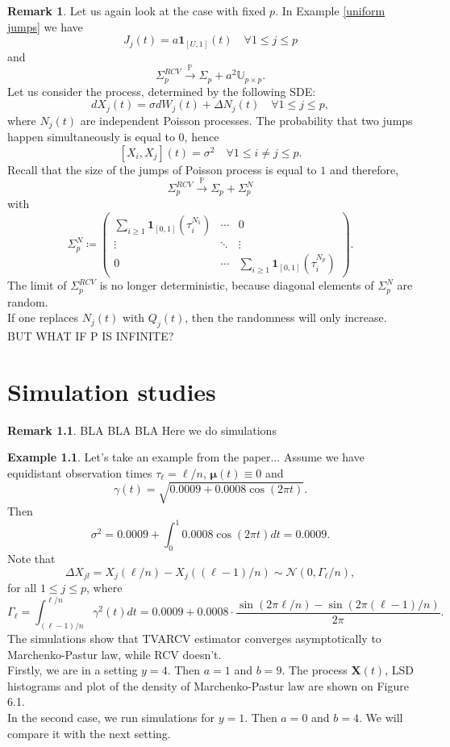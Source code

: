 \documentclass[a4paper,11pt]{book}
\theoremstyle{plain}
\theoremstyle{definition}
\newtheorem{exmp}[thm]{Example}
\newtheorem{rmrk}[thm]{Remark}
\newcommand{\MP}{\mathbb{P}}
\begin{document}
    \begin{rmrk}
    	Let us again look at the case with fixed $p$. In Example \ref{uniform jumps} we have
    	\[J_j(t) = a\mathbf{1}_{[U, 1]}(t) \quad \forall 1 \leq j \leq p \]
    	and
    	\[ \Sigma_p^{RCV} \xrightarrow{\MP} \Sigma_p + a^2\mathbb{U}_{p \times p}.  \]    	
    	Let us consider the process, determined by the following SDE:
    	\[ dX_j(t) = \sigma dW_j(t) + \Delta N_j(t) \quad \forall 1 \leq j \leq p, \]
    	where $N_j(t)$ are independent Poisson processes. The probability that two jumps happen simultaneously is equal to $0$, hence
    	\[ [X_i, X_j](t) = \sigma^2 \quad \forall 1 \leq i \neq j \leq p. \]
    	Recall that the size of the jumps of Poisson process is equal to $1$ and therefore,
    	\[ \Sigma_p^{RCV} \xrightarrow{\MP} \Sigma_p + \Sigma_p^N\]
    	with
    	\[
    	 \Sigma_p^N \coloneqq \begin{pmatrix}
    	\sum_{i \geq 1} \mathbf{1}_{[0, 1]} (\tau_i^{N_1}) & \cdots & 0 \\
    	\vdots & \ddots & \vdots \\
    	0 & \cdots & \sum_{i \geq 1} \mathbf{1}_{[0, 1]} (\tau_i^{N_p})
    	\end{pmatrix}
    	. \]
    	The limit of $\Sigma_p^{RCV}$ is no longer deterministic, because diagonal elements of $\Sigma_p^N$ are random. \\
    	If one replaces $N_j(t)$ with $Q_j(t)$, then the randomness will only increase.
    	BUT WHAT IF P IS INFINITE?
    \end{rmrk}
    
    \chapter{Simulation studies}
    
    \begin{rmrk}
    	BLA BLA BLA Here we do simulations
    \end{rmrk}
    
    \begin{exmp} \label{SimCos}
    	Let's take an example from the paper... Assume we have equidistant observation times $\tau_{\ell} = \ell / n$, $\boldsymbol{\mu}(t) \equiv 0$ and
    	\[
    	\gamma(t) = \sqrt{0.0009 + 0.0008 \cos(2 \pi t)}.
    	\]
    	Then
    	\[ \sigma^2 = 0.0009 + \int_{0}^{1}0.0008 \cos(2 \pi t) dt = 0.0009. \]
    	Note that
    	\[ \Delta X_{jl} = X_j(\ell/n) - X_j((\ell-1)/n) \sim \mathcal{N}(0, \Gamma_\ell / n ), \]
    	for all $1 \leq j \leq p$, where
    	\[ \Gamma_\ell = \int_{(\ell-1)/n}^{\ell / n} \gamma^2(t)dt = 0.0009 + 0.0008 \cdot \frac{ \sin(2\pi \ell / n )-\sin(2\pi (\ell-1) / n ) }{2\pi}. \]
    	The simulations show that TVARCV estimator converges asymptotically to Marchenko-Pastur law, while RCV doesn't. \\
    	Firstly, we are in a setting $y = 4$. Then $a = 1$ and $b = 9$. The process $\mathbf{X}(t)$, LSD histograms and plot of the density of Marchenko-Pastur law are shown on Figure 6.1. \\
    	In the second case, we run simulations for $y = 1$. Then $a = 0$ and $b = 4$. We will compare it with the next setting.
    \end{exmp}
    
\end{document}
